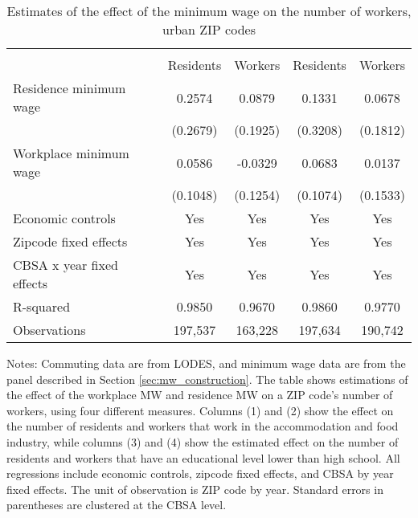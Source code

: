 \begin{table}[hbt!] \centering
    \caption{Estimates of the effect of the minimum wage on the number of workers, urban ZIP codes}
    \label{tab:total_migration}
    \begin{tabular}{lcccc}
        \toprule 
        &  &  \\ \cmidrule(lr){2-3} \cmidrule(lr){4-5}
                    & Residents & Workers & Residents & Workers \\  \midrule
        Residence minimum wage &  0.2574  &  0.0879  &  0.1331  &  0.0678  \\
                               & (0.2679) & (0.1925) & (0.3208) & (0.1812) \\
        Workplace minimum wage &  0.0586  &  -0.0329  &  0.0683  &  0.0137  \\
                               & (0.1048) & (0.1254) & (0.1074) & (0.1533) \\  \midrule
        Economic controls           &  Yes   &  Yes   &  Yes  &  Yes  \\
        Zipcode fixed effects       &  Yes   &  Yes   &  Yes  &  Yes  \\
        CBSA x year fixed effects   &  Yes   &  Yes   &  Yes  &  Yes  \\
        R-squared                   &  0.9850   &  0.9670   &  0.9860  &  0.9770  \\
        Observations                &  197,537  &  163,228  &  197,634 &  190,742  
        \\\bottomrule
    \end{tabular}
    
    \begin{minipage}{.95\textwidth} \footnotesize
        \vspace{2mm}
        Notes: Commuting data are from LODES, and minimum wage 
        data are from the panel described in Section \ref{sec:mw_construction}.
        The table shows estimations of the effect of the workplace MW and
        residence MW on a ZIP code's number of workers, using four 
        different measures. 
        Columns (1) and (2) show the effect on the number of residents and 
        workers that work in the accommodation and food industry, while 
        columns (3) and (4) show the estimated effect on the number of 
        residents and workers that have an educational level lower than high 
        school. 
        All regressions include economic controls, zipcode fixed effects, 
        and CBSA by year fixed effects.
        The unit of observation is ZIP code by year.
        Standard errors in parentheses are clustered at the CBSA level.
    \end{minipage}
\end{table}
